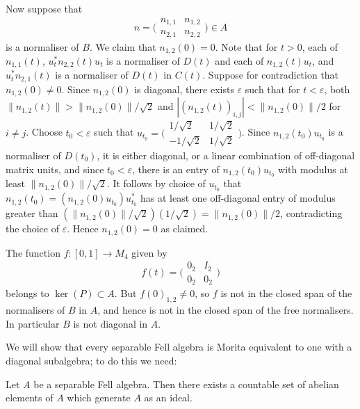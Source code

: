 \documentclass[12pt,a4paper]{amsart}
\begin{document}
\begin{example}
Now suppose that
\[
n = \Big(\begin{array}{cc} n_{1,1} & n_{1,2} \\ n_{2,1} & n_{2,2} \end{array}\Big) \in A
\]
is a normaliser of $B$. We claim that $n_{1,2}(0) = 0$. Note that for $t
> 0$, each of $n_{1,1}(t)$, $u_t^* n_{2,2}(t) u_t$ is a
normaliser of $D(t)$ and each of $n_{1,2}(t) u_t$, and $u^*_t
n_{2,1}(t)$ is a normaliser of $D(t)$ in $C(t)$. Suppose for
contradiction that  $n_{1,2}(0) \not= 0$.
Since $n_{1,2}(0)$ is diagonal, there exists $\varepsilon$ such
that for $t < \varepsilon$, both $\|n_{1,2}(t)\| >
\|n_{1,2}(0)\|/\sqrt{2}$ and $|(n_{1,2}(t))_{i,j}| <
\|n_{1,2}(0)\|/2$ for $i \not= j$. Choose $t_0 < \varepsilon$
such that $u_{t_0} = \big(\begin{smallmatrix} 1/\sqrt{2} &
1/\sqrt{2} \\ -1/\sqrt{2} & 1/\sqrt{2}\end{smallmatrix}\big)$.
Since $n_{1,2}(t_0)u_{t_0}$ is a normaliser of $D(t_0)$, it is either
diagonal, or a linear combination of off-diagonal matrix units,
and since $t_0 < \varepsilon$, there is an entry of
$n_{1,2}(t_0)u_{t_0}$ with modulus at least
$\|n_{1,2}(0)\|/\sqrt{2}$. It follows by choice of $u_{t_0}$
that $n_{1,2}(t_0) = (n_{1,2}(0)u_{t_0}) u^*_{t_0}$ has at
least one off-diagonal entry of modulus greater than
$(\|n_{1,2}(0)\|/\sqrt{2})(1/\sqrt{2}) = \|n_{1,2}(0)\|/2$,
contradicting the choice of $\varepsilon$. Hence $n_{1,2}(0) = 0$ as
claimed.

The function $f : [0,1] \to M_4$ given by
\[
f(t) = \big(\begin{smallmatrix} 0_2 & I_2 \\ 0_2 & 0_2 \end{smallmatrix}\big)
\]
belongs to $\ker(P) \subset A$. But $f(0)_{1,2} \not=0$, so $f$ is
not in the closed span of the normalisers of $B$ in
$A$, and hence is not in the closed span of the free normalisers. In particular $B$ is not diagonal in $A$.
\end{example}

We will show that every separable Fell algebra is Morita
equivalent to one with a diagonal subalgebra; to do this we need:

\begin{lemma}
Let $A$ be a separable Fell algebra. Then there exists a
countable set of abelian elements of $A$ which generate $A$ as
an ideal.
\end{lemma}
\end{document}
